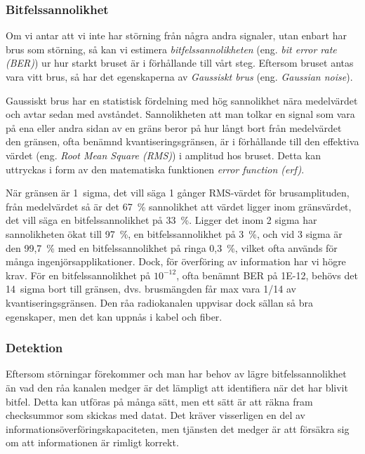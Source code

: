 \subsubsection{Bitfelssannolikhet}

Om vi antar att vi inte har störning från några andra signaler, utan enbart har
brus som störning, så kan vi estimera \emph{bitfelssannolikheten} (eng.
\emph{bit error rate (BER)}) ur hur starkt bruset är i förhållande till vårt
steg. Eftersom bruset antas vara vitt brus, så har det egenskaperna av
\emph{Gaussiskt brus} (eng. \emph{Gaussian noise}).

Gaussiskt brus har en statistisk fördelning med hög sannolikhet nära
medelvärdet och avtar sedan med avståndet. Sannolikheten att man tolkar en
signal som vara på ena eller andra sidan av en gräns beror på hur långt bort
från medelvärdet den gränsen, ofta benämnd kvantiseringsgränsen, är i
förhållande till den effektiva värdet (eng. \emph{Root Mean Square (RMS)}) i
amplitud hos bruset. Detta kan uttryckas i form av den matematiska funktionen
\emph{error function (erf)}.

När gränsen är 1~sigma, det vill säga 1 gånger RMS-värdet för brusamplituden,
från medelvärdet så är det 67~\% sannolikhet att värdet ligger inom
gränsvärdet, det vill säga en bitfelssannolikhet på 33~\%.
Ligger det inom 2 sigma har sannolikheten ökat till 97~\%, en
bitfelssannolikhet på 3~\%, och vid 3 sigma är den 99,7~\% med en
bitfelssannolikhet på ringa 0,3~\%, vilket ofta används för många
ingenjörsapplikationer. Dock, för överföring av information har vi högre krav.
För en bitfelssannolikhet på \(10^{-12}\), ofta benämnt BER på 1E-12, behövs
det 14~sigma bort till gränsen, dvs. brusmängden får max vara 1/14 av
kvantiseringsgränsen.
Den råa radiokanalen uppvisar dock sällan så bra egenskaper, men det kan uppnås
i kabel och fiber.

\subsubsection{Detektion}
\label{bitfel_detektion}

Eftersom störningar förekommer och man har behov av lägre bitfelssannolikhet
än vad den råa kanalen medger är det lämpligt att identifiera när det har
blivit bitfel. Detta kan utföras på många sätt, men ett sätt är att räkna fram
checksummor som skickas med datat. Det kräver visserligen en del av
informationsöverföringskapaciteten, men tjänsten det medger är att försäkra sig
om att informationen är rimligt korrekt.


